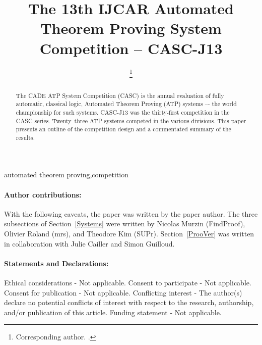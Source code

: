 \documentclass[aic]{iosart2x}
\newcommand{\THIS}{\mbox{CASC-J13}}
\newcommand{\NUMBEROFENTRANTS}{\mbox{Twenty three}}
\newcommand{\NTHCOMPETITION}{\mbox{thirty-first}}
\begin{document}
\begin{frontmatter}                           %
%
\title{The 13th IJCAR Automated Theorem Proving System Competition -- \THIS{}}
\runtitle{\THIS{}}
\maketitle
%
\begin{aug}
\author[A]{   \thanks{Corresponding author. .}}
\address[A]{Department of Computer Science, ,
}
\end{aug}

\begin{abstract}
The CADE ATP System Competition (CASC) is the annual evaluation of fully automatic, classical
logic, Automated Theorem Proving (ATP) systems –- the world championship for such systems.
\THIS{} was the \NTHCOMPETITION{} competition in the CASC series.
\NUMBEROFENTRANTS{} ATP systems competed in the various divisions.
This paper presents an outline of the competition design and a commentated summary of the results.
\end{abstract}

\begin{keyword}
automated theorem proving\sep competition
\end{keyword}
%
\end{frontmatter}
\paragraph{Author contributions:} With the following caveats, the paper was written by 
the paper author.
The three subsections of Section~\ref{Systems} were written by Nicolas Murzin (FindProof), 
Olivier Roland (mrs), and Theodore Kim (SUPr).
Section~\ref{ProoVer} was written in collaboration with Julie Cailler and Simon Guilloud.

\paragraph{Statements and Declarations:} 
Ethical considerations - Not applicable.
Consent to participate - Not applicable.
Consent for publication - Not applicable.
Conflicting interest - The author(s) declare no potential conflicts of interest with respect to 
the research, authorship, and/or publication of this article.
Funding statement - Not applicable.
\end{document}
